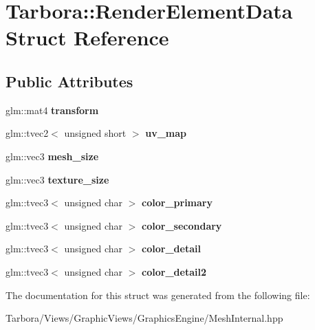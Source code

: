 \hypertarget{structTarbora_1_1RenderElementData}{}\section{Tarbora\+:\+:Render\+Element\+Data Struct Reference}
\label{structTarbora_1_1RenderElementData}
\subsection*{Public Attributes}
\begin{DoxyCompactItemize}
\item 
\mbox{\label{structTarbora_1_1RenderElementData_af6851788b28279b172c40265caeade79}} 
glm\+::mat4 {\bfseries transform}
\item 
\mbox{\label{structTarbora_1_1RenderElementData_a8f8a9501c235224fc620900b357032a3}} 
glm\+::tvec2$<$ unsigned short $>$ {\bfseries uv\+\_\+map}
\item 
\mbox{\label{structTarbora_1_1RenderElementData_a13ad1880a9e724df27fca96dfe1adbd4}} 
glm\+::vec3 {\bfseries mesh\+\_\+size}
\item 
\mbox{\label{structTarbora_1_1RenderElementData_aa24a753da2f142bf9b530c449bd8b6c7}} 
glm\+::vec3 {\bfseries texture\+\_\+size}
\item 
\mbox{\label{structTarbora_1_1RenderElementData_a5f4e9a6a9a7a27741acd55c0803e30c0}} 
glm\+::tvec3$<$ unsigned char $>$ {\bfseries color\+\_\+primary}
\item 
\mbox{\label{structTarbora_1_1RenderElementData_a643a94ab7496a7167cd189655e8b5bbc}} 
glm\+::tvec3$<$ unsigned char $>$ {\bfseries color\+\_\+secondary}
\item 
\mbox{\label{structTarbora_1_1RenderElementData_a3048ab5a8b69bbd0b8fb5e757d015991}} 
glm\+::tvec3$<$ unsigned char $>$ {\bfseries color\+\_\+detail}
\item 
\mbox{\label{structTarbora_1_1RenderElementData_a8936a0972098b2320fb9b9700b661811}} 
glm\+::tvec3$<$ unsigned char $>$ {\bfseries color\+\_\+detail2}
\end{DoxyCompactItemize}


The documentation for this struct was generated from the following file\+:\begin{DoxyCompactItemize}
\item 
Tarbora/\+Views/\+Graphic\+Views/\+Graphics\+Engine/Mesh\+Internal.\+hpp\end{DoxyCompactItemize}
